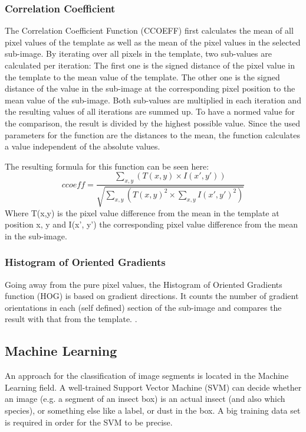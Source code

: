\subsubsection{Correlation Coefficient}
The Correlation Coefficient Function (CCOEFF) first calculates the mean of all pixel values of the template as well as the mean of the pixel values in the selected sub-image.
By iterating over all pixels in the template, two sub-values are calculated per iteration:
The first one is the signed distance of the pixel value in the template to the mean value of the template.
The other one is the signed distance of the value in the sub-image at the corresponding pixel position to the mean value of the sub-image.
Both sub-values are multiplied in each iteration and the resulting values of all iterations are summed up.
To have a normed value for the comparison, the result is divided by the highest possible value.
Since the used parameters for the function are the distances to the mean, the function calculates a value independent of the absolute values.

The resulting formula for this function can be seen here:
\[ccoeff = \frac{\sum_{x,y} (T(x,y) \times I(x',y'))}{\sqrt{\sum_{x,y} (T(x,y)^2 \times \sum_{x,y} I(x',y')^2)}} \]
Where T(x,y) is the pixel value difference from the mean in the template at position x, y and I(x', y') the corresponding pixel value difference from the mean in the sub-image.

\subsubsection{Histogram of Oriented Gradients}
Going away from the pure pixel values, the Histogram of Oriented Gradients function (HOG) is based on gradient directions.
It counts the number of gradient orientations in each (self defined) section of the sub-image and compares the result with that from the template.
\cite{hog_function}.

\subsection{Machine Learning}
An approach for the classification of image segments is located in the Machine Learning field.
A well-trained Support Vector Machine (SVM) \cite{svm} can decide whether an image (e.g. a segment of an insect box) is an actual insect (and also which species), or something else like a label, or dust in the box.
A big training data set is required in order for the SVM to be precise.

